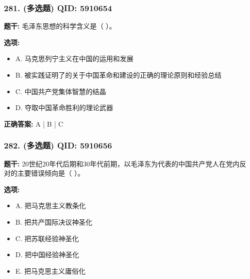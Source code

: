 \documentclass[12pt,UTF8]{ctexart}
\begin{document}
\vspace{0.3em}\hrulefill\vspace{0.7em}

\subsubsection*{281. (多选题) \small QID: 5910654}

\textbf{题干:}
毛泽东思想的科学含义是（ ）。

\textbf{选项:}
\begin{itemize}[leftmargin=*]

  \item A. 马克思列宁主义在中国的运用和发展

  \item B. 被实践证明了的关于中国革命和建设的正确的理论原则和经验总结

  \item C. 中国共产党集体智慧的结晶

  \item D. 夺取中国革命胜利的理论武器

\end{itemize}

\textbf{正确答案:}
A | B | C

\vspace{0.3em}\hrulefill\vspace{0.7em}

\subsubsection*{282. (多选题) \small QID: 5910656}

\textbf{题干:}
20世纪20年代后期和30年代前期，以毛泽东为代表的中国共产党人在党内反对的主要错误倾向是（ ）。

\textbf{选项:}
\begin{itemize}[leftmargin=*]

  \item A. 把马克思主义教条化

  \item B. 把共产国际决议神圣化

  \item C. 把苏联经验神圣化

  \item D. 把中国经验神圣化

  \item E. 把马克思主义庸俗化

\end{itemize}
\end{document}
